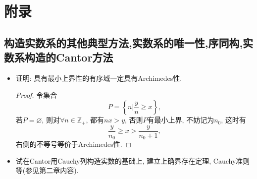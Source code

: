 \section{附录}
\subsection{构造实数系的其他典型方法,实数系的唯一性,序同构,实数系构造的Cantor方法}
\begin{5a}
\begin{itemize}
\item[1.] 证明: 具有最小上界性的有序域一定具有Archimedes性.
\begin{proof}
令集合\[P=\left\lbrace n\Big|\frac{y}{n}\geqslant x \right\rbrace,\]
若\(P=\varnothing\), 则对\(\forall n\in\mathbb{Z}_+\), 都有\(nx>y\), 
否则\(P\)有最小上界, 不妨记为\(n_0\), 这时有
\[\frac{y}{n_0}\geqslant x>\frac{y}{n_0+1},\]右侧的不等号等价于Archimedes性.
\end{proof}
\end{itemize}
\end{5a}
\begin{5b}
\begin{itemize}
\item[1.]  试在Cantor用Cauchy列构造实数的基础上, 建立上确界存在定理, Cauchy准则等(参见第二章内容).
\end{itemize}
\end{5b}